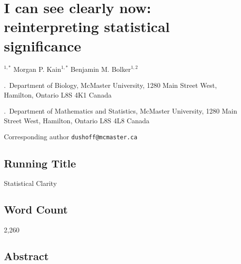 \documentclass[12pt, english, dvipsnames, table]{article} %
\begin{document}
%


\section*{I can see clearly now: reinterpreting statistical significance}

$\mbox{}^{1,*}$
\hfill
{Morgan P. Kain}$\mbox{}^{1,*}$
\hfill
{Benjamin M. Bolker}$\mbox{}^{1,2}$

\medskip{}.~{Department of Biology, McMaster University, 1280 Main Street West, Hamilton, Ontario L8S 4K1 Canada}

\medskip{}.~{Department of Mathematics and Statistics, McMaster University, 1280 Main Street West, Hamilton, Ontario 
L8S 4L8 Canada}

\medskip\noindent * Corresponding author \tt{dushoff@mcmaster.ca}

\flushbottom


\linenumbers

\subsection*{Running Title}

Statistical Clarity

\subsection*{Word Count}

2,260

\subsection*{Abstract}
\end{document}
